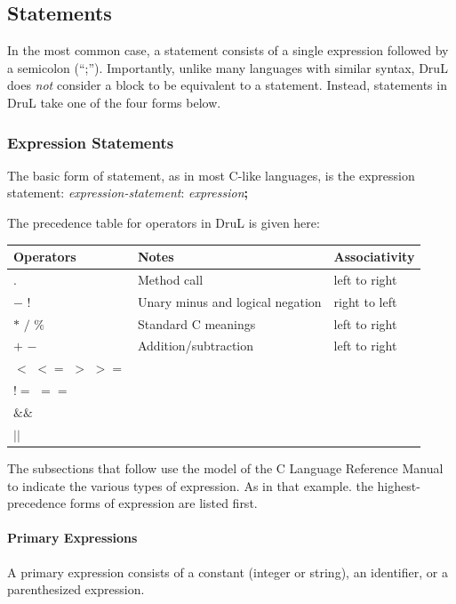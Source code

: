 \documentclass[11pt,twoside]{article}
\begin{document}
\subsection{Statements}

In the most common case, a statement consists of a single expression followed by a semicolon (``;'').  Importantly, unlike many languages with similar syntax, DruL does \emph{not} consider a block to be equivalent to a statement.  Instead, statements in DruL take one of the four forms below.



\subsubsection{Expression Statements}

The basic form of statement, as in most C-like languages, is the expression statement: \emph{expression-statement}: \emph{expression}\textbf{;}

The precedence table for operators in DruL is given here:

\begin{tabular}{ l |l| l}
\hline\hline
Operators & Notes & Associativity \\
\hline $ . $ & Method call & left to right \\
$-$  $!$ &Unary minus and logical negation & right to left \\
$*$ $/$ $\%$ & Standard C meanings & left to right \\
$+$ $-$ & Addition/subtraction & left to right \\
$<$ $<=$ $>$ $>=$ &  &  \\
$!=$ $==$ &  & \\
$\&\&$ &  & \\
$||$ &  & \\
\end{tabular}

The subsections that follow use the model of the C Language Reference Manual to indicate the various types of expression.  As in that example. the highest-precedence forms of expression are listed first.

\paragraph{Primary Expressions}

A primary expression consists of a constant (integer or string), an identifier, or a parenthesized expression.
\end{document}
